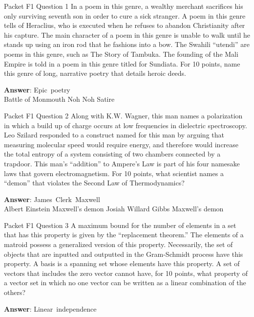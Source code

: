 \begin{frame}{Packet F1 Question 1}
In a poem in this genre,   a wealthy merchant sacrifices his only surviving seventh son in order to cure a sick stranger. A   poem in this genre tells of Heraclius, who is executed when he refuses to abandon Christianity after his capture. The main character of a poem in this genre is unable to walk until he stands up using an iron rod that he fashions into a bow. The Swahili “utendi” are poems in this genre, such as The Story of Tambuka. The founding of the Mali Empire is told in a poem in this genre titled for Sundiata. For 10 points, name this genre of long, narrative poetry that   details heroic deeds.      

\textbf{Answer}: Epic\ poetry\\
 Battle of Monmouth
 Noh
 Noh
 Satire
\end{frame}

\begin{frame}{Packet F1 Question 2}
Along with K.W. Wagner, this man names a polarization in which a build up of charge occurs at low frequencies in dielectric spectroscopy. Leo Szilard responded to a construct named for this man by arguing   that measuring molecular speed would require energy, and therefore would increase the total entropy of a system consisting of two chambers connected by a trapdoor.   This man’s “addition” to Ampere’s Law is part of his   four namesake laws that govern electromagnetism. For 10 points,   what scientist names a “demon” that violates the Second Law of Thermodynamics?    

\textbf{Answer}: James\ Clerk\ Maxwell\\
 Albert Einstein
 Maxwell's demon
 Josiah Willard Gibbs
 Maxwell's demon
\end{frame}

\begin{frame}{Packet F1 Question 3}
A maximum bound for the number of elements in a set that has this property is given by the “replacement theorem.” The elements of a matroid possess   a generalized version of this property. Necessarily, the set of objects that are inputted and outputted in the Gram-Schmidt process have this property. A basis is a spanning set whose elements have this property. A set of vectors that   includes the zero vector cannot have, for 10 points, what property of a vector set in which no one vector can be written as a linear combination   of the others?  

\textbf{Answer}: Linear\ independence\\
\end{frame}

